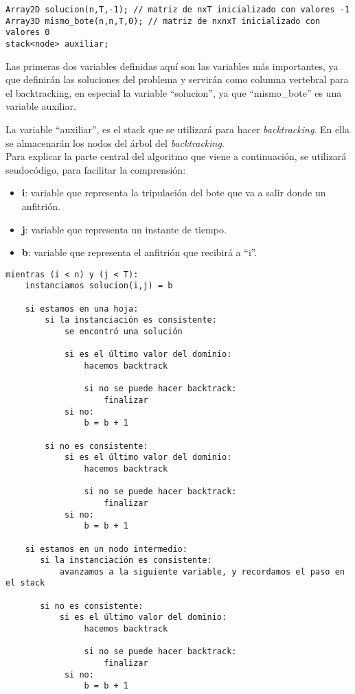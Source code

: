 \documentclass[letter, 10pt]{article}
\begin{document}
\begin{verbatim}
Array2D solucion(n,T,-1); // matriz de nxT inicializado con valores -1
Array3D mismo_bote(n,n,T,0); // matriz de nxnxT inicializado con valores 0
stack<node> auxiliar;
\end{verbatim}

Las primeras dos variables definidas aquí son las variables más importantes, ya que definirán las soluciones del problema y servirán como columna vertebral para el backtracking, en especial la variable ``solucion'', ya que ``mismo\_bote'' es una variable auxiliar.

La variable ``auxiliar'', es el stack que se utilizará para hacer \textit{backtracking}. En ella se almacenarán los nodos del árbol del \textit{backtracking}.\\

Para explicar la parte central del algoritmo que viene a continuación, se utilizará seudocódigo, para facilitar la comprensión:

\begin{itemize}
\item \textbf{i}: variable que representa la tripulación del bote que va a salir donde un anfitrión.
\item \textbf{j}: variable que representa un instante de tiempo.
\item \textbf{b}: variable que representa el anfitrión que recibirá a ``i''.
\end{itemize}

\begin{verbatim}
mientras (i < n) y (j < T):
    instanciamos solucion(i,j) = b
    
    si estamos en una hoja:
        si la instanciación es consistente:
            se encontró una solución
            
            si es el último valor del dominio:
                hacemos backtrack
                
                si no se puede hacer backtrack:
                    finalizar
            si no:
                b = b + 1

        si no es consistente:
            si es el último valor del dominio:
                hacemos backtrack
                
                si no se puede hacer backtrack:
                    finalizar
            si no:
                b = b + 1
                
    si estamos en un nodo intermedio:
       si la instanciación es consistente:
           avanzamos a la siguiente variable, y recordamos el paso en el stack
           
       si no es consistente:
           si es el último valor del dominio:
                hacemos backtrack
                
                si no se puede hacer backtrack:
                    finalizar
            si no:
                b = b + 1
            
\end{verbatim}
\end{document}
